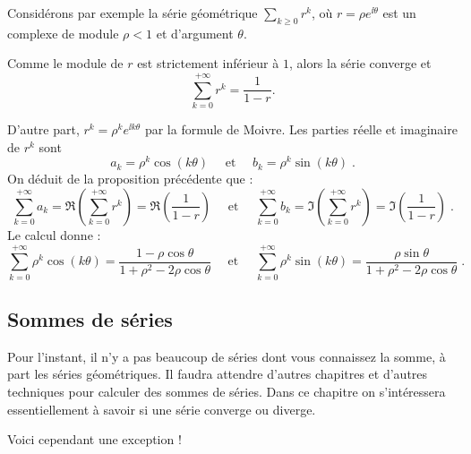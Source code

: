 \documentclass[class=report,crop=false]{standalone}
\begin{document}
\begin{exemple}
Considérons par exemple la série géométrique $\sum_{k\ge0} r^k$, où
$r = \rho e^{\ii\theta}$ est un complexe de module $\rho<1$ et d'argument $\theta$.

Comme le module de $r$ est strictement inférieur à $1$, alors la série converge et 
$$\sum_{k=0}^{+\infty} r^k = \frac{1}{1-r}.$$

D'autre part, $r^k = \rho^k e^{\ii k\theta}$ par la formule de Moivre. 
Les parties réelle et imaginaire de $r^k$ sont
$$
a_k=\rho^k\cos(k\theta)
\quad\text{ et }\quad 
b_k=\rho^k\sin(k\theta)\;.
$$
On déduit de la proposition précédente que :
$$
\sum_{k=0}^{+\infty} a_k = \Re \left(\sum_{k=0}^{+\infty} r^k\right) = \Re \left(\frac{1}{1-r}\right) 
\quad\text{ et }\quad 
\sum_{k=0}^{+\infty} b_k = \Im \left(\sum_{k=0}^{+\infty} r^k\right)  = \Im \left(\frac{1}{1-r}\right)\;. 
$$
Le calcul donne :
$$
\sum_{k=0}^{+\infty} \rho^k\cos(k\theta) = 
\frac{1-\rho\cos\theta}{1+\rho^2-2\rho\cos\theta} 
\quad\text{ et }\quad 
\sum_{k=0}^{+\infty} \rho^k\sin(k\theta) = 
\frac{\rho\sin\theta}{1+\rho^2-2\rho\cos\theta}
\;. 
$$  
\end{exemple}

\subsection{Sommes de séries}


Pour l'instant, il n'y a pas beaucoup de séries dont vous connaissez 
la somme, à part les séries géométriques. Il faudra attendre d'autres chapitres
et d'autres techniques pour calculer des sommes de séries. Dans ce chapitre
on s'intéressera essentiellement à savoir si une série converge ou diverge.

\bigskip

Voici cependant une exception !
\end{document}
